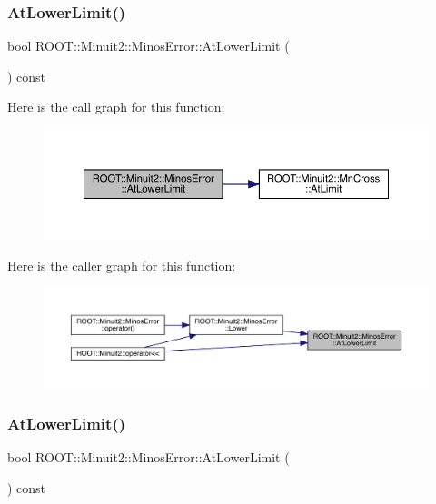 \subsubsection{\texorpdfstring{AtLowerLimit()}{AtLowerLimit()}\hspace{0.1cm}{\footnotesize\ttfamily [1/2]}}
{\footnotesize\ttfamily bool R\+O\+O\+T\+::\+Minuit2\+::\+Minos\+Error\+::\+At\+Lower\+Limit (\begin{DoxyParamCaption}{ }\end{DoxyParamCaption}) const\hspace{0.3cm}{\ttfamily [inline]}}

Here is the call graph for this function\+:
\nopagebreak
\begin{figure}[H]
\begin{center}
\leavevmode
\includegraphics[width=350pt]{d2/dd1/classROOT_1_1Minuit2_1_1MinosError_ab5bac1c70b34e42714730cad95978b51_cgraph}
\end{center}
\end{figure}
Here is the caller graph for this function\+:\nopagebreak
\begin{figure}[H]
\begin{center}
\leavevmode
\includegraphics[width=350pt]{d2/dd1/classROOT_1_1Minuit2_1_1MinosError_ab5bac1c70b34e42714730cad95978b51_icgraph}
\end{center}
\end{figure}
\mbox{\label{classROOT_1_1Minuit2_1_1MinosError_ab5bac1c70b34e42714730cad95978b51}} 
\subsubsection{\texorpdfstring{AtLowerLimit()}{AtLowerLimit()}\hspace{0.1cm}{\footnotesize\ttfamily [2/2]}}
{\footnotesize\ttfamily bool R\+O\+O\+T\+::\+Minuit2\+::\+Minos\+Error\+::\+At\+Lower\+Limit (\begin{DoxyParamCaption}{ }\end{DoxyParamCaption}) const\hspace{0.3cm}{\ttfamily [inline]}}

